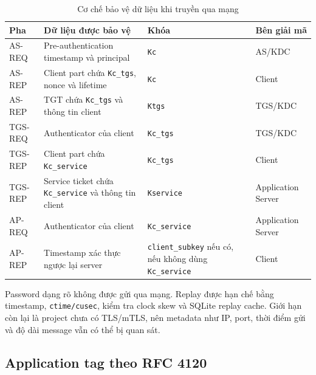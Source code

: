 \documentclass[12pt]{article}
\begin{document}
\begin{table}[H]
\centering
\renewcommand{\arraystretch}{1.25}
\begin{tabularx}{\textwidth}{|p{3.5cm}|p{5.1cm}|p{2.8cm}|X|}
\hline
\textbf{Pha} & \textbf{Dữ liệu được bảo vệ} & \textbf{Khóa} & \textbf{Bên giải mã} \\
\hline
AS-REQ & Pre-authentication timestamp và principal & \texttt{Kc} & AS/KDC \\
\hline
AS-REP & Client part chứa \texttt{Kc\_tgs}, nonce và lifetime & \texttt{Kc} & Client \\
\hline
AS-REP & TGT chứa \texttt{Kc\_tgs} và thông tin client & \texttt{Ktgs} & TGS/KDC \\
\hline
TGS-REQ & Authenticator của client & \texttt{Kc\_tgs} & TGS/KDC \\
\hline
TGS-REP & Client part chứa \texttt{Kc\_service} & \texttt{Kc\_tgs} & Client \\
\hline
TGS-REP & Service ticket chứa \texttt{Kc\_service} và thông tin client & \texttt{Kservice} & Application Server \\
\hline
AP-REQ & Authenticator của client & \texttt{Kc\_service} & Application Server \\
\hline
AP-REP & Timestamp xác thực ngược lại server & \texttt{client\_subkey} nếu có, nếu không dùng \texttt{Kc\_service} & Client \\
\hline
\end{tabularx}
\caption{Cơ chế bảo vệ dữ liệu khi truyền qua mạng}
\end{table}

Password dạng rõ không được gửi qua mạng. Replay được hạn chế bằng timestamp, \texttt{ctime/cusec}, kiểm tra clock skew và SQLite replay cache. Giới hạn còn lại là project chưa có TLS/mTLS, nên metadata như IP, port, thời điểm gửi và độ dài message vẫn có thể bị quan sát.

\subsection{Application tag theo RFC 4120}
\end{document}
